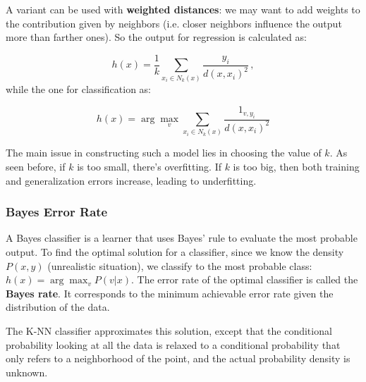 A variant can be used with \textbf{weighted distances}: we may want to add weights to the contribution given by neighbors (i.e. closer neighbors influence the output more than farther ones). So the output for regression is calculated as:

\begin{equation*}
    h(x) = \frac{1}{k}\sum_{x_i \in N_k(x)} \dfrac{y_i}{d(x,x_i)^2} \, ,
\end{equation*}
while the one for classification as:

\begin{equation*}
    h(x) = \arg \max_v \sum_{x_i \in N_k(x)}  \dfrac{1_{v,y_i}}{d(x,x_i)^2}
\end{equation*}

The main issue in constructing such a model lies in choosing the value of $k$. As seen before, if $k$ is too small, there's overfitting. If $k$ is too big, then both training and generalization errors increase, leading to underfitting.

\subsubsection{Bayes Error Rate}
A Bayes classifier is a learner that uses Bayes' rule to evaluate the most probable output. To find the optimal solution for a classifier, since we know the density $P(x,y)$ (unrealistic situation), we classify to the most probable class: $h(x) = \arg \max_v P(v|x)$. The error rate of the optimal classifier is called the \textbf{Bayes rate}. It corresponds to the minimum achievable error rate given the distribution of the data.

The K-NN classifier approximates this solution, except that the conditional probability looking at all the data is relaxed to a conditional probability that only refers to a neighborhood of the point, and the actual probability density is unknown.

